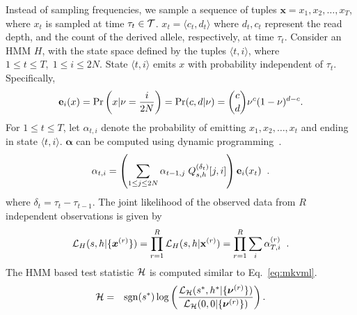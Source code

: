 \documentclass[11pt]{article}
\def\comale{\text{COMALE }}
\begin{document}
Instead of sampling frequencies, we sample a sequence of tuples
$\mathbf{x}=x_1,x_2,\ldots,x_T$, where $x_t$ is sampled at time
$\tau_t\in {\cal T}$. $x_t = \langle c_t,d_t \rangle$ where $d_t, c_t$
represent the read depth, and the count of the derived allele,
respectively, at time $\tau_t$. Consider an HMM $H$, with the state
space defined by the tuples $\langle t, i\rangle$, where $1\leq t\leq
T,\; 1\le i\le 2N$. State $\langle t, i\rangle$ emits $x$ with
probability independent of $\tau_t$. Specifically,
\begin{equation*}
{\bf e}_{i}(x)=\operatorname{Pr}\left (x|\nu=\frac{i}{2N}\right)=\operatorname{Pr}(c,d|\nu) 
        = {c \choose d} \nu^c(1-\nu)^{d-c}.
\end{equation*}
For $1\le t\le T$, let $\alpha_{t,i}$ denote the probability of
emitting $x_1,x_2,\ldots,x_t$ and ending in state $\langle t,
i\rangle$. $\bm{\alpha}$ can be computed using dynamic
programming~\cite{durbin1998biological}.
\begin{equation}
  \alpha_{t,i} = \left( \sum_{1\le j\le 2N} \alpha_{t-1,j}\;Q^{(\delta_t)}_{s,h}[j,i] \right) {\bf e}_{i}(x_t)\;\; .
  \label{eq:hmm}
\end{equation}
where $\delta_t=\tau_t-\tau_{t-1}$. The joint likelihood of the
observed data from $R$ independent observations is given by
\begin{equation}
  {\cal L}_{H}(s,h|\{\bm{x}^{(r)}\})=\prod_{r=1}^R{\cal L}_{H}(s,h|\mathbf{x}^{(r)}) = \prod_{r=1}^R \sum_i\alpha_{T,i}^{(r)}\;\;.
  \label{eq:hmmlik}
\end{equation}
The HMM based \comale test statistic ${\cal H}$ is computed similar to Eq.~\ref{eq:mkvml}.
\begin{eqnarray}
{\cal H} &=& \operatorname{sgn}(s^*)\log 
\left(\frac{{\cal L}_{\cal H}(s^*,h^*|\{\bm{\nu}^{(r)}\})}{{\cal L}_{\cal H}(0,0|\{\bm{\nu}^{(r)}\})}\right).
\label{eq:hmmml}
\end{eqnarray}
\end{document}
